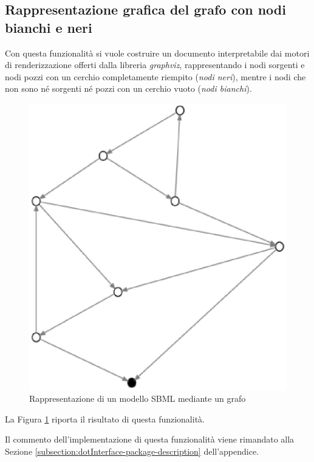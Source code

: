 \subsection{Rappresentazione grafica del grafo con nodi bianchi e
  neri}
\label{subsection:represent-it-in-black-and-white}
Con questa funzionalit\`a si vuole costruire un documento
interpretabile dai motori di renderizzazione offerti dalla libreria
\emph{graphviz}, rappresentando i nodi sorgenti e nodi pozzi con un
cerchio completamente riempito (\emph{nodi neri}), mentre i nodi che
non sono n\'e sorgenti n\'e pozzi con un cerchio vuoto (\emph{nodi
  bianchi}).
\begin{figure}
  \centering
  \includegraphics[scale=0.8]{images/applicationOfPrinterPipeFilterOnTarjanModel-phase-PrinterPipeFilter-level-0.eps}
  \caption{Rappresentazione di un modello SBML mediante un grafo}
  \label{fig:simple-black-and-white}
\end{figure}
La Figura \ref{fig:simple-black-and-white} riporta il risultato di
questa funzionalit\`a.

Il commento dell'implementazione di questa funzionalit\`a viene
rimandato alla Sezione
\ref{subsection:dotInterface-package-description} dell'appendice.

